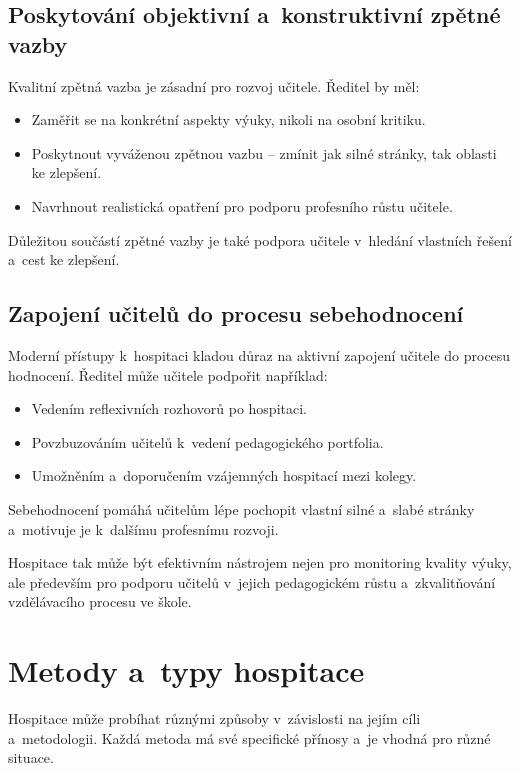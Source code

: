 \subsection{Poskytování objektivní a~konstruktivní zpětné vazby}
Kvalitní zpětná vazba je zásadní pro rozvoj učitele. Ředitel by měl:

\begin{itemize}
    \item Zaměřit se na konkrétní aspekty výuky, nikoli na osobní kritiku.
    \item Poskytnout vyváženou zpětnou vazbu – zmínit jak silné stránky, tak oblasti ke zlepšení.
    \item Navrhnout realistická opatření pro podporu profesního růstu učitele.
\end{itemize}

Důležitou součástí zpětné vazby je také podpora učitele v~hledání vlastních řešení a~cest ke zlepšení.

\subsection{Zapojení učitelů do procesu sebehodnocení}
Moderní přístupy k~hospitaci kladou důraz na aktivní zapojení učitele do procesu hodnocení. Ředitel může učitele podpořit například:

\begin{itemize}
    \item Vedením reflexivních rozhovorů po hospitaci.
    \item Povzbuzováním učitelů k~vedení pedagogického portfolia.
    \item Umožněním a~doporučením vzájemných hospitací mezi kolegy.
\end{itemize}

Sebehodnocení pomáhá učitelům lépe pochopit vlastní silné a~slabé stránky a~motivuje je k~dalšímu profesnímu rozvoji.

Hospitace tak může být efektivním nástrojem nejen pro monitoring kvality výuky, ale především pro podporu učitelů v~jejich pedagogickém růstu a~zkvalitňování vzdělávacího procesu ve škole.



\section{Metody a~typy hospitace}

Hospitace může probíhat různými způsoby v~závislosti na jejím cíli a~metodologii. Každá metoda má své specifické přínosy a~je vhodná pro různé situace.

